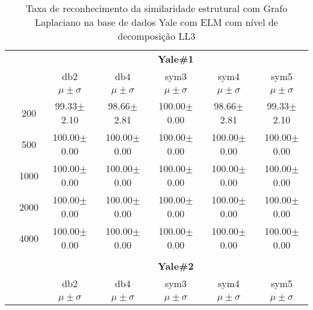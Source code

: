 \begin{table}[H]
	\centering
    \normalsize
	\caption{Taxa de reconhecimento da similaridade estrutural com Grafo Laplaciano na base de dados Yale com ELM com nível de decomposição LL3}
   
	\begin{tabular}{|c|c|c c c c c|}
\cline{3-7}
\multicolumn{2}{c|}{\multirow{3}{*}{}} & \multicolumn{5}{c|}{\textbf{Yale\#1}}   \\\cline{3-7} 
\multicolumn{2}{c|}{}  & db2 & db4 & sym3 & sym4 & sym5 \\\cline{3-7}%
\multicolumn{2}{c|}{}& $\mu \pm \sigma$ & $\mu \pm \sigma$ & $\mu \pm \sigma$ & $\mu \pm \sigma$ & $\mu \pm \sigma$ \\\hline


\multicolumn{1}{|c|}{ \multirow{5}{*}{\rotatebox[origin=c]{90}{\textbf{Neurônios}}} }

& 200	&99.33$\pm$2.10		&98.66$\pm$2.81		&100.00$\pm$0.00	&98.66$\pm$2.81	 &99.33$\pm$2.10	 \\\cline{2-7}

& 500	&100.00$\pm$0.00 	&100.00$\pm$0.00	&100.00$\pm$0.00	&100.00$\pm$0.00 &100.00$\pm$0.00	 \\\cline{2-7}

& 1000	&100.00$\pm$0.00	&100.00$\pm$0.00	&100.00$\pm$0.00	&100.00$\pm$0.00 &100.00$\pm$0.00	\\\cline{2-7}

& 2000	&100.00$\pm$0.00	&100.00$\pm$0.00	&100.00$\pm$0.00	&100.00$\pm$0.00 &100.00$\pm$0.00	\\\cline{2-7}

& 4000	&100.00$\pm$0.00	&100.00$\pm$0.00	&100.00$\pm$0.00	&100.00$\pm$0.00 &100.00$\pm$0.00	 \\\midrule

\multicolumn{7}{c}{}\\ 

\cline{3-7}
\multicolumn{2}{c|}{\multirow{3}{*}{}} & \multicolumn{5}{c|}{\textbf{Yale\#2}}   \\\cline{3-7} 
\multicolumn{2}{c|}{}  & db2 & db4 & sym3 & sym4 & sym5 \\\cline{3-7}%
\multicolumn{2}{c|}{}& $\mu \pm \sigma$ & $\mu \pm \sigma$ & $\mu \pm \sigma$ & $\mu \pm \sigma$ & $\mu \pm \sigma$ \\\hline



\end{tabular}
\end{table}
